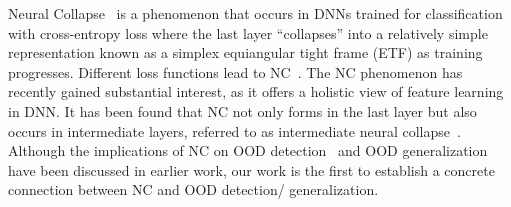 Neural Collapse~\cite{papyan2020prevalence, kothapalli2023neural, zhu2021geometric, han2022neural} is a phenomenon that occurs in DNNs trained for classification with cross-entropy loss where the last layer ``collapses'' into a relatively simple representation known as a simplex equiangular tight frame (ETF) as training progresses. Different loss functions lead to NC~\cite{han2022neural, zhou2022all}.
The NC phenomenon has recently gained substantial interest, as it offers a holistic view of feature learning in DNN. 
It has been found that NC not only forms in the last layer but also occurs in intermediate layers, referred to as intermediate neural collapse~\cite{rangamani2023feature}.
Although the implications of NC on OOD detection~\cite{haas2023linking, wu2024pursuing} and OOD generalization~\cite{kothapalli2023neural, masarczyk2023tunnel, harun2024what} have been discussed in earlier work, 
our work is the first to establish a concrete connection between NC and OOD detection/ generalization. %



